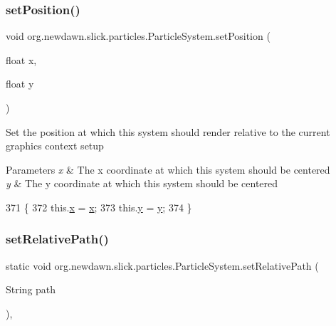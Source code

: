 \subsubsection{\texorpdfstring{set\+Position()}{setPosition()}}
{\footnotesize\ttfamily void org.\+newdawn.\+slick.\+particles.\+Particle\+System.\+set\+Position (\begin{DoxyParamCaption}\item[{float}]{x,  }\item[{float}]{y }\end{DoxyParamCaption})\hspace{0.3cm}{\ttfamily [inline]}}

Set the position at which this system should render relative to the current graphics context setup


\begin{DoxyParams}{Parameters}
{\em x} & The x coordinate at which this system should be centered \\
\hline
{\em y} & The y coordinate at which this system should be centered \\
\hline
\end{DoxyParams}

\begin{DoxyCode}
371                                               \{
372         this.\mbox{\hyperlink{classorg_1_1newdawn_1_1slick_1_1particles_1_1_particle_system_a3a332738b4f587da66ea20842e5745cc}{x}} = \mbox{\hyperlink{classorg_1_1newdawn_1_1slick_1_1particles_1_1_particle_system_a3a332738b4f587da66ea20842e5745cc}{x}};
373         this.\mbox{\hyperlink{classorg_1_1newdawn_1_1slick_1_1particles_1_1_particle_system_a507fdd9d8d8f431e3d70ec770e6f9bb7}{y}} = \mbox{\hyperlink{classorg_1_1newdawn_1_1slick_1_1particles_1_1_particle_system_a507fdd9d8d8f431e3d70ec770e6f9bb7}{y}};
374     \}
\end{DoxyCode}
\mbox{\label{classorg_1_1newdawn_1_1slick_1_1particles_1_1_particle_system_ae11b05b6d526fb199647632d8aa93b74}} 
\subsubsection{\texorpdfstring{set\+Relative\+Path()}{setRelativePath()}}
{\footnotesize\ttfamily static void org.\+newdawn.\+slick.\+particles.\+Particle\+System.\+set\+Relative\+Path (\begin{DoxyParamCaption}\item[{String}]{path }\end{DoxyParamCaption})\hspace{0.3cm}{\ttfamily [inline]}, {\ttfamily [static]}}


